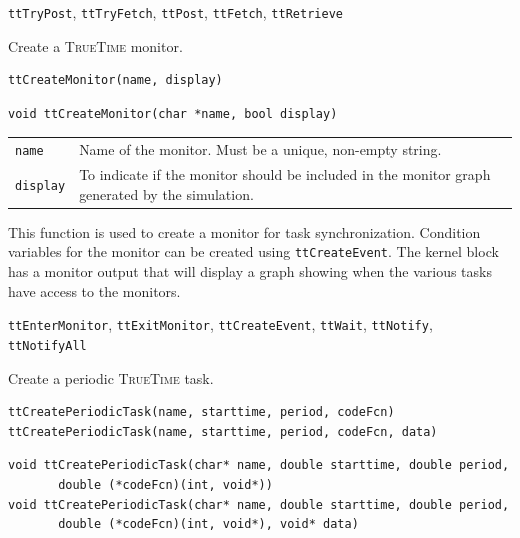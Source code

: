 \documentclass[final,twoside]{rapport}
\begin{document}
\seealso 
{\tt ttTryPost}, {\tt ttTryFetch}, {\tt ttPost}, {\tt ttFetch}, {\tt ttRetrieve}



\purpose
Create a \textsc{TrueTime} monitor.

\Msyntax
\begin{verbatim}
ttCreateMonitor(name, display)
\end{verbatim}

\Csyntax
\begin{verbatim}
void ttCreateMonitor(char *name, bool display)
\end{verbatim}

\args
\begin{tabularx}{\hsize}{l>{\raggedright\arraybackslash}X}
  {\tt name} & Name of the monitor. Must be a unique, non-empty string. \\
  {\tt display} & To indicate if the monitor should be included in the
  monitor graph generated by the simulation.
\end{tabularx}

\descr This function is used to create a monitor for task
synchronization. Condition variables for the monitor can be created
using {\tt ttCreateEvent}. The kernel block has a monitor output that
will display a graph showing when the various tasks have access to the
monitors.

\seealso 
{\tt ttEnterMonitor}, {\tt ttExitMonitor}, {\tt ttCreateEvent},
{\tt ttWait}, {\tt ttNotify}, {\tt ttNotifyAll}



\purpose
Create a periodic \textsc{TrueTime} task.

\Msyntax
\begin{verbatim}
ttCreatePeriodicTask(name, starttime, period, codeFcn)
ttCreatePeriodicTask(name, starttime, period, codeFcn, data)
\end{verbatim}

\Csyntax
\begin{verbatim}
void ttCreatePeriodicTask(char* name, double starttime, double period,
       double (*codeFcn)(int, void*))
void ttCreatePeriodicTask(char* name, double starttime, double period,
       double (*codeFcn)(int, void*), void* data)
\end{verbatim}
\end{document}
